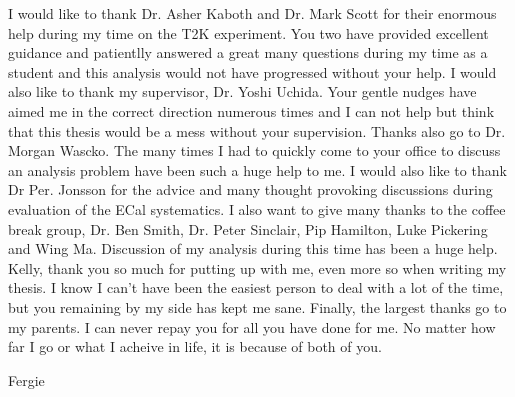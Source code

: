 \begin{acknowledgements}
I would like to thank Dr. Asher Kaboth and Dr. Mark Scott for their enormous help during my time on the T2K experiment.  You two have provided excellent guidance and patientlly answered a great many questions during my time as a student and this analysis would not have progressed without your help.
\newline
\newline
I would also like to thank my supervisor, Dr. Yoshi Uchida.  Your gentle nudges have aimed me in the correct direction numerous times and I can not help but think that this thesis would be a mess without your supervision.
\newline
\newline
Thanks also go to Dr. Morgan Wascko.  The many times I had to quickly come to your office to discuss an analysis problem have been such a huge help to me.
\newline
\newline
I would also like to thank Dr Per. Jonsson for the advice and many thought provoking discussions during evaluation of the ECal systematics.
\newline
\newline
I also want to give many thanks to the coffee break group, Dr. Ben Smith, Dr. Peter Sinclair, Pip Hamilton, Luke Pickering and Wing Ma.  Discussion of my analysis during this time has been a huge help.
\newline
\newline
Kelly, thank you so much for putting up with me, even more so when writing my thesis.  I know I can't have been the easiest person to deal with a lot of the time, but you remaining by my side has kept me sane.
\newline
\newline
Finally, the largest thanks go to my parents.  I can never repay you for all you have done for me.  No matter how far I go or what I acheive in life, it is because of both of you.
\end{acknowledgements}


%

\tableofcontents


%
  {Fergie}
\thispagestyle{empty}

